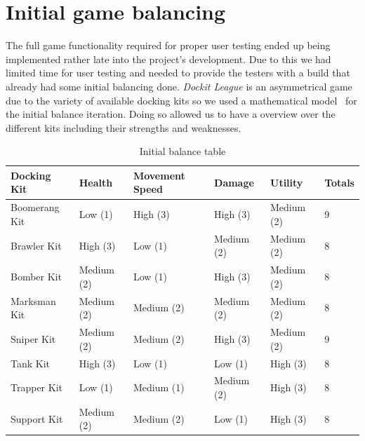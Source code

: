 \section{Initial game balancing}
The full game functionality required for proper user testing ended up being implemented rather late into the project's development. Due to this we had limited time for user testing and needed to provide the testers with a build that already had some initial balancing done. 
\emph{Dockit League} is an asymmetrical game due to the variety of available docking kits so we used a mathematical model~\cite{schell2014art} for the initial balance iteration. Doing so allowed us to have a overview over the different kits including their strengths and weaknesses.

\begin{table}[tbph]
\centering
\caption{Initial balance table}
\label{tab:initBalance}
\begin{tabular}{@{}llllll@{}}
\toprule
\textbf{Docking Kit} & \textbf{Health} & \textbf{Movement Speed} & \textbf{Damage} & \textbf{Utility} & \textbf{Totals} \\ \midrule
Boomerang Kit        & Low (1)         & High (3)                & High (3)        & Medium (2)       & 9               \\
Brawler Kit          & High (3)        & Low (1)                 & Medium (2)      & Medium (2)       & 8               \\
Bomber Kit           & Medium (2)      & Low (1)                 & High (3)        & Medium (2)       & 8               \\
Marksman Kit         & Medium (2)      & Medium (2)              & Medium (2)      & Medium (2)       & 8               \\
Sniper Kit           & Medium (2)      & Medium (2)              & High (3)        & Medium (2)       & 9               \\
Tank Kit             & High (3)        & Low (1)                 & Low (1)         & High (3)         & 8               \\
Trapper Kit          & Low  (1)        & Medium (1)              & Medium (2)      & High (3)         & 8               \\
Support Kit          & Medium (2)      & Medium (2)              & Low (1)         & High (3)         & 8               \\ \bottomrule
\end{tabular}
\end{table}

